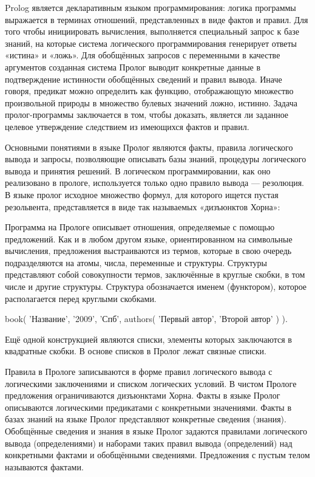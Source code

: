 \hspace{0.6cm}Prolog является декларативным языком программирования: логика программы выражается в терминах отношений, представленных в виде фактов и правил. Для того чтобы инициировать вычисления, выполняется специальный запрос к базе знаний, на которые система логического программирования генерирует ответы «истина» и «ложь». Для обобщённых запросов с переменными в качестве аргументов созданная система Пролог выводит конкретные данные в подтверждение истинности обобщённых сведений и правил вывода.
Иначе говоря, предикат можно определить как функцию, отображающую множество произвольной природы в множество булевых значений {ложно, истинно}. Задача пролог-программы заключается в том, чтобы доказать, является ли заданное целевое утверждение следствием из имеющихся фактов и правил.

\hspace{0.6cm}Основными понятиями в языке Пролог являются факты, правила логического вывода и запросы, позволяющие описывать базы знаний, процедуры логического вывода и принятия решений. В логическом программировании, как оно реализовано в прологе, используется только одно правило вывода — резолюция.
В языке пролог исходное множество формул, для которого ищется пустая резольвента, представляется в виде так называемых «дизъюнктов Хорна»:

\hspace{0.6cm}Программа на Прологе описывает отношения, определяемые с помощью предложений. Как и в любом другом языке, ориентированном на символьные вычисления, предложения выстраиваются из термов, которые в свою очередь подразделяются на атомы, числа, переменные и структуры.
\hspace{0.6cm}Структуры представляют собой совокупности термов, заключённые в круглые скобки, в том числе и другие структуры. Структура обозначается именем (функтором), которое располагается перед круглыми скобками.

book( 'Название', '2009', 'Спб', authors( 'Первый автор', 'Второй автор' ) ).

Ещё одной конструкцией являются списки, элементы которых заключаются в квадратные скобки. В основе списков в Пролог лежат связные списки.

\hspace{0.6cm}Правила в Прологе записываются в форме правил логического вывода с логическими заключениями и списком логических условий. В чистом Прологе предложения ограничиваются дизъюнктами Хорна.
\hspace{0.6cm}Факты в языке Пролог описываются логическими предикатами с конкретными значениями. Факты в базах знаний на языке Пролог представляют конкретные сведения (знания). Обобщённые сведения и знания в языке Пролог задаются правилами логического вывода (определениями) и наборами таких правил вывода (определений) над конкретными фактами и обобщёнными сведениями. Предложения с пустым телом называются фактами.


	
